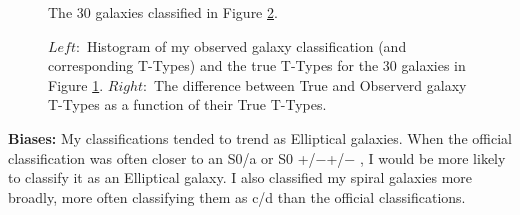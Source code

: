 \documentclass[12pt]{article}
\newenvironment{problem}[2][Problem]{\begin{trivlist}
\item[\hskip \labelsep {\bfseries #1}\hskip \labelsep {\bfseries #2.}]}{\end{trivlist}}
\begin{document}
\begin{figure}[ht!]
\vspace{-3 mm}
\centerline{}
\caption[]{The 30 galaxies classified in Figure \ref{galplots}.}
\label{galclass}
\end{figure}

\begin{figure}[ht!]
\centerline{}
\caption[]{$Left:$ Histogram of my observed galaxy classification (and corresponding T-Types) and the true T-Types for the 30 galaxies in Figure \ref{galclass}. $Right:$ The difference between True and Observerd galaxy T-Types as a function of their True T-Types.}
\label{galplots}
\end{figure}

\textbf{Biases:} My classifications tended to trend as Elliptical galaxies. When the official classification was often closer to an S0/a or S0 +/−+/− , I would be more likely to classify it as an Elliptical galaxy. I also classified my spiral galaxies more broadly, more often classifying them as c/d than the official classifications.

 \pagebreak
\begin{problem}{4}
\end{problem}
\end{document}
